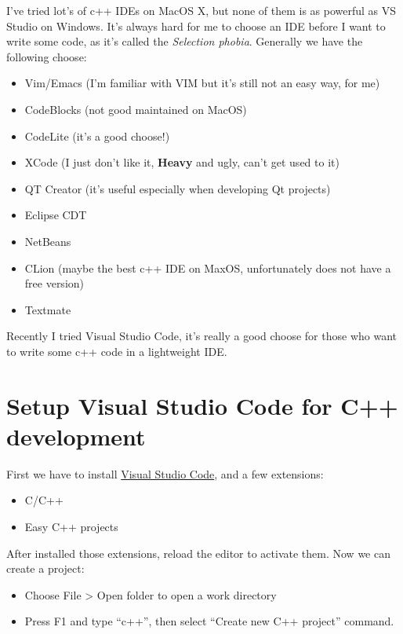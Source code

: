 \documentclass[12pt]{article}
\begin{document}
\makeblogtitle

I've tried lot's of c++ IDEs on MacOS X, but none of them is as powerful as VS Studio on Windows. It's always hard for me to choose an IDE before I want to write some code, as it's called the \emph{Selection phobia}. Generally we have the following choose:

\begin{itemize}
\tightlist
\item
  Vim/Emacs (I'm familiar with VIM but it's still not an easy way, for me)
\item
  CodeBlocks (not good maintained on MacOS)
\item
  CodeLite (it's a good choose!)
\item
  XCode (I just don't like it, \textbf{Heavy} and ugly, can't get used to it)
\item
  QT Creator (it's useful especially when developing Qt projects)
\item
  Eclipse CDT
\item
  NetBeans
\item
  CLion (maybe the best c++ IDE on MaxOS, unfortunately does not have a free version)
\item
  Textmate
\end{itemize}

Recently I tried Visual Studio Code, it's really a good choose for those who want to write some c++ code in a lightweight IDE.

\section{Setup Visual Studio Code for C++ development}\label{setup-visual-studio-code-for-c-development}

First we have to install \href{https://code.visualstudio.com/}{Visual Studio Code}, and a few extensions:

\begin{itemize}
\tightlist
\item
  C/C++
\item
  Easy C++ projects
\end{itemize}

After installed those extensions, reload the editor to activate them. Now we can create a project:

\begin{itemize}
\tightlist
\item
  Choose File \textgreater{} Open folder to open a work directory
\item
  Press F1 and type ``c++'', then select ``Create new C++ project'' command.
\end{itemize}
\end{document}

